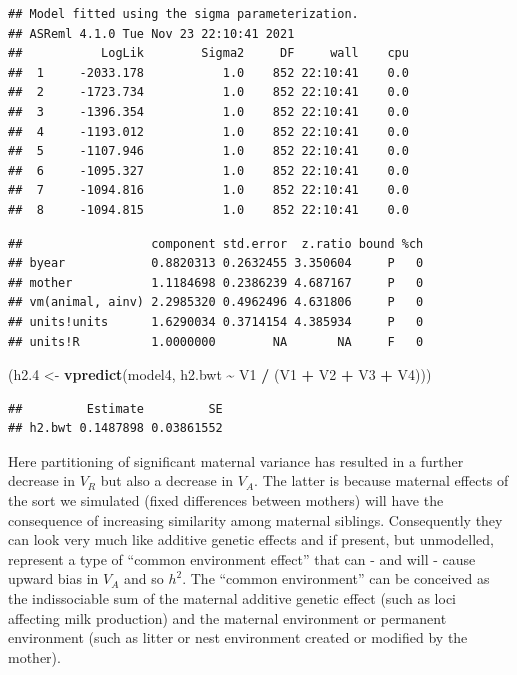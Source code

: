 \documentclass[
  12pt,
]{book}
\newenvironment{Shaded}{\begin{snugshade}}{\end{snugshade}}
\newcommand{\FloatTok}[1]{\textcolor[rgb]{0.00,0.00,0.81}{#1}}
\newcommand{\KeywordTok}[1]{\textcolor[rgb]{0.13,0.29,0.53}{\textbf{#1}}}
\newcommand{\NormalTok}[1]{#1}
\newcommand{\OperatorTok}[1]{\textcolor[rgb]{0.81,0.36,0.00}{\textbf{#1}}}
\newcommand{\StringTok}[1]{\textcolor[rgb]{0.31,0.60,0.02}{#1}}
\begin{document}
\begin{verbatim}
## Model fitted using the sigma parameterization.
## ASReml 4.1.0 Tue Nov 23 22:10:41 2021
##           LogLik        Sigma2     DF     wall    cpu
##  1     -2033.178           1.0    852 22:10:41    0.0
##  2     -1723.734           1.0    852 22:10:41    0.0
##  3     -1396.354           1.0    852 22:10:41    0.0
##  4     -1193.012           1.0    852 22:10:41    0.0
##  5     -1107.946           1.0    852 22:10:41    0.0
##  6     -1095.327           1.0    852 22:10:41    0.0
##  7     -1094.816           1.0    852 22:10:41    0.0
##  8     -1094.815           1.0    852 22:10:41    0.0
\end{verbatim}

\begin{Shaded}
\end{Shaded}

\begin{verbatim}
##                  component std.error  z.ratio bound %ch
## byear            0.8820313 0.2632455 3.350604     P   0
## mother           1.1184698 0.2386239 4.687167     P   0
## vm(animal, ainv) 2.2985320 0.4962496 4.631806     P   0
## units!units      1.6290034 0.3714154 4.385934     P   0
## units!R          1.0000000        NA       NA     F   0
\end{verbatim}

\begin{Shaded}
\begin{Highlighting}[]
\NormalTok{(h2}\FloatTok{.4}\NormalTok{ \textless{}{-}}\StringTok{ }\KeywordTok{vpredict}\NormalTok{(model4, h2.bwt }\OperatorTok{\textasciitilde{}}\StringTok{ }\NormalTok{V1 }\OperatorTok{/}\StringTok{ }\NormalTok{(V1 }\OperatorTok{+}\StringTok{ }\NormalTok{V2 }\OperatorTok{+}\StringTok{ }\NormalTok{V3 }\OperatorTok{+}\StringTok{ }\NormalTok{V4)))}
\end{Highlighting}
\end{Shaded}

\begin{verbatim}
##         Estimate         SE
## h2.bwt 0.1487898 0.03861552
\end{verbatim}

Here partitioning of significant maternal variance has resulted in a further decrease in \(V_R\) but also a decrease in \(V_A\). The latter is because maternal effects of the sort we simulated (fixed differences between mothers) will have the consequence of increasing similarity among maternal siblings. Consequently they can look very much like additive genetic effects and if present, but unmodelled, represent a type of ``common environment effect'' that can - and will - cause upward bias in \(V_A\) and so \(h^2\).
The ``common environment'' can be conceived as the indissociable sum of the maternal additive genetic effect (such as loci affecting milk production) and the maternal environment or permanent environment (such as litter or nest environment created or modified by the mother).
\end{document}
